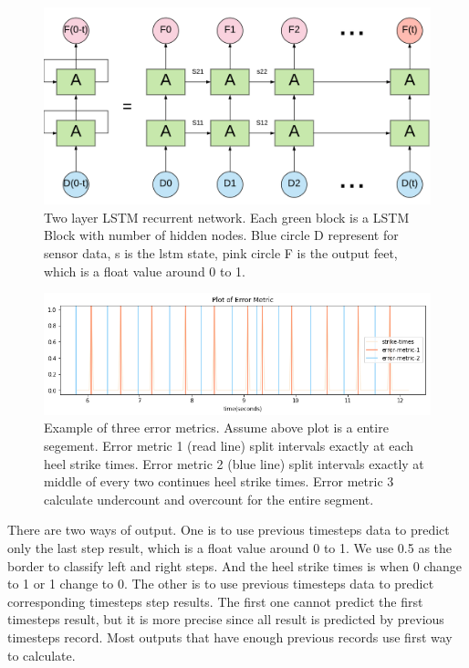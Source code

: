 \documentclass[11pt]{article}
\begin{document}
\begin{figure}[ht]
\centering
\includegraphics[scale=0.3]{LSTM3}
\caption{Two layer LSTM recurrent network. Each green block is a LSTM Block with number of hidden nodes. Blue circle D represent for sensor data, s is the lstm state, pink circle F is the output feet, which is a float value around 0 to 1.}
\label{fig:label}
\end{figure}

\begin{figure}[ht]
\centering
\includegraphics[scale=0.6]{error_metric}
\caption{Example of three error metrics. Assume above plot is a entire segement. Error metric 1 (read line) split intervals exactly at each heel strike times. Error metric 2 (blue line) split intervals exactly at middle of every two continues heel strike times. Error metric 3 calculate undercount and overcount for the entire segment.}
\label{fig:label}
\end{figure}

There are two ways of output. One is to use previous timesteps data to predict only the last step result, which is a float value around 0 to 1. We use 0.5 as the border to classify left and right steps. And the heel strike times is when 0 change to 1 or 1 change to 0. The other is to use previous timesteps data to predict corresponding timesteps step results. The first one cannot predict the first timesteps result, but it is more precise since all result is predicted by previous timesteps record. Most outputs that have enough previous records use first way to calculate.
\end{document}
